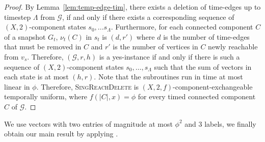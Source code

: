 \documentclass[a4paper,UKenglish,cleveref, autoref, thm-restate]{lipics-v2021} %
\DeclareMathOperator{\defended}{\textit{defended}}
\DeclareMathOperator{\burning}{\textit{burning}}
\DeclareMathOperator{\unburnt}{\textit{unburnt}}
\DeclareMathOperator{\newdef}{\textit{new}}
\begin{document}
\begin{toappendix}
\begin{proof}
    By Lemma~\ref{lem:temp-edge-tim}, there exists a deletion of time-edges up to timestep $\Lambda$ from $\mathcal{G}$, if and only if there exists a corresponding sequence of $(X,2)$-component states $s_0, ... s_{\Lambda}$. Furthermore, for each connected component $C$ of a snapshot $G_t$, $\nu_t(C)$ in $s_t$ is $(d,r')$ where $d$ is the number of time-edges that must be removed in $C$ and $r'$ is the number of vertices in $C$ newly reachable from $v_s$. Therefore, $(\mathcal{G},r,h)$ is a yes-instance if and only if there is such a sequence of $(X,2)$-component states $s_0,\ldots,s_{\Lambda}$ such that the sum of vectors in each state is at most $(h,r)$. Note that the subroutines run in time at most linear in $\phi$. Therefore, \textsc{SingReachDelete} is $(X,2,f)$-component-exchangeable temporally uniform, where $f(|C|,x)=\phi$ for every timed connected component $C$ of $\mathcal{G}$.
\end{proof}
 We use vectors with two entries of magnitude at most $\phi^2$ and $3$ labels, we finally obtain our main result by applying .

\TIMdeletion*




\end{toappendix}
\end{document}

